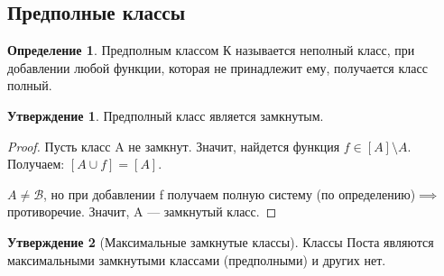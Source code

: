 \documentclass[a4paper]{article}
\theoremstyle{definition}
\newtheorem*{definition}{Определение}
\newtheorem*{statement}{Утверждение}
\theoremstyle{remark}
\begin{document}
    \subsection*{Предполные классы}
    \begin{definition}
        Предполным классом К называется неполный класс, при добавлении любой функции,
        которая не принадлежит ему, получается класс полный.
    \end{definition}
    \begin{statement}Предполный класс является замкнутым.
    \end{statement} 
    \begin{proof}
        Пусть класс A не замкнут. 
        Значит, найдется функция $f \in [A] \setminus A$. Получаем:
        $[A \cup {f}] = [A].$

        $A\neq \mathcal{B}$, но при добавлении f получаем полную систему (по определению)$\implies$ противоречие.
        Значит, A — замкнутый класс.
    \end{proof}
    \begin{statement}[Максимальные замкнутые классы]
        Классы Поста являются максимальными замкнутыми классами (предполными) и других нет.
    \end{statement}
\end{document}
